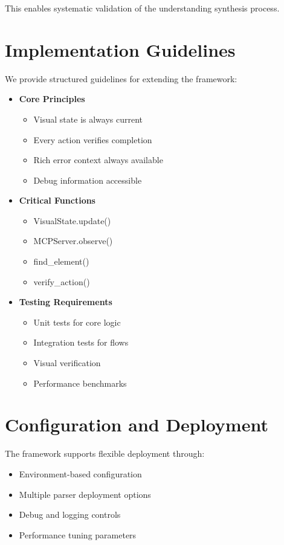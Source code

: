 \documentclass{article}
\begin{document}
This enables systematic validation of the understanding synthesis process.

\section{Implementation Guidelines}
We provide structured guidelines for extending the framework:

\begin{itemize}
    \item \textbf{Core Principles}
    \begin{itemize}
        \item Visual state is always current
        \item Every action verifies completion
        \item Rich error context always available
        \item Debug information accessible
    \end{itemize}
    
    \item \textbf{Critical Functions}
    \begin{itemize}
        \item VisualState.update()
        \item MCPServer.observe()
        \item find\_element()
        \item verify\_action()
    \end{itemize}
    
    \item \textbf{Testing Requirements}
    \begin{itemize}
        \item Unit tests for core logic
        \item Integration tests for flows
        \item Visual verification
        \item Performance benchmarks
    \end{itemize}
\end{itemize}

\section{Configuration and Deployment}
The framework supports flexible deployment through:

\begin{itemize}
    \item Environment-based configuration
    \item Multiple parser deployment options
    \item Debug and logging controls
    \item Performance tuning parameters
\end{itemize}
\end{document}
